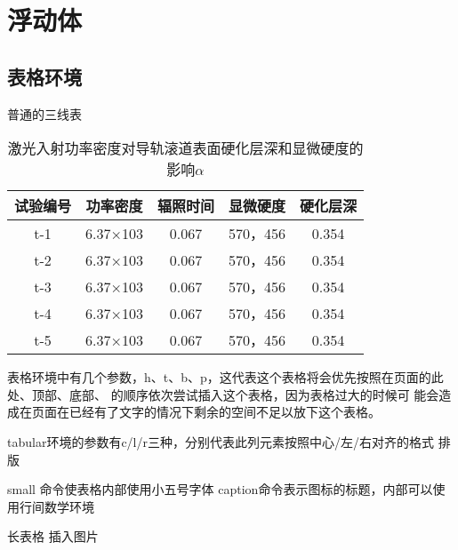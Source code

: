 \documentclass[supercite,fontset=windows]{../../upcthesis}
\begin{document}
\section{浮动体}

\subsection{表格环境}

普通的三线表

\begin{table}[htbp]
        \newcommand{\tabincell}[2]{\begin{tabular}{@{}#1@{}}#2\end{tabular}}
        \centering
        \caption{激光入射功率密度对导轨滚道表面硬化层深和显微硬度的影响$\alpha$}
        \begin{tabular}{ccccc}
                \toprule    %
                试验编号 & 功率密度 & 辐照时间 & 显微硬度       & 硬化层深\\ 
                \midrule    %
                t-1	&6.37×103	&0.067	&570，456	&0.354\\
                t-2	&6.37×103	&0.067	&570，456	&0.354\\
                t-3	&6.37×103	&0.067	&570，456	&0.354\\
                t-4	&6.37×103	&0.067	&570，456	&0.354\\
                t-5	&6.37×103	&0.067	&570，456	&0.354\\ 
          \bottomrule   %
        \end{tabular}
        \label{data_table}
\end{table}

表格环境中有几个参数，h、t、b、p，这代表这个表格将会优先按照在页面的此
处、顶部、底部、 的顺序依次尝试插入这个表格，因为表格过大的时候可
能会造成在页面在已经有了文字的情况下剩余的空间不足以放下这个表格。


tabular环境的参数有c/l/r三种，分别代表此列元素按照中心/左/右对齐的格式
排版

small 命令使表格内部使用小五号字体
caption命令表示图标的标题，内部可以使用行间数学环境


长表格
插入图片
\end{document}
